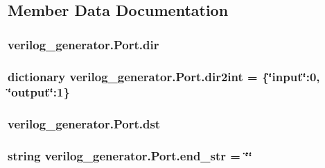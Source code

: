 \subsection{Member Data Documentation}
\hypertarget{classverilog__generator_1_1Port_a7b2a8292d0545a4cf35ac056b2570d2e}{
\subsubsection[{dir}]{\setlength{\rightskip}{0pt plus 5cm}verilog\-\_\-generator.\-Port.\-dir}}\label{classverilog__generator_1_1Port_a7b2a8292d0545a4cf35ac056b2570d2e}
\hypertarget{classverilog__generator_1_1Port_a0ea87b8342a1ac4fe26ef336eab5c3cf}{
\subsubsection[{dir2int}]{\setlength{\rightskip}{0pt plus 5cm}dictionary verilog\-\_\-generator.\-Port.\-dir2int = \{\char`\"{}input\char`\"{}\-:0, \char`\"{}output\char`\"{}\-:1\}\hspace{0.3cm}{\ttfamily [static]}}}\label{classverilog__generator_1_1Port_a0ea87b8342a1ac4fe26ef336eab5c3cf}
\hypertarget{classverilog__generator_1_1Port_aeae9d721aea818e4632e95841cfd3c9e}{
\subsubsection[{dst}]{\setlength{\rightskip}{0pt plus 5cm}verilog\-\_\-generator.\-Port.\-dst}}\label{classverilog__generator_1_1Port_aeae9d721aea818e4632e95841cfd3c9e}
\hypertarget{classverilog__generator_1_1Port_aee949dd28d29fdbab884785abddc2e06}{
\subsubsection[{end\-\_\-str}]{\setlength{\rightskip}{0pt plus 5cm}string verilog\-\_\-generator.\-Port.\-end\-\_\-str = \char`\"{}\char`\"{}\hspace{0.3cm}{\ttfamily [static]}}}\label{classverilog__generator_1_1Port_aee949dd28d29fdbab884785abddc2e06}
